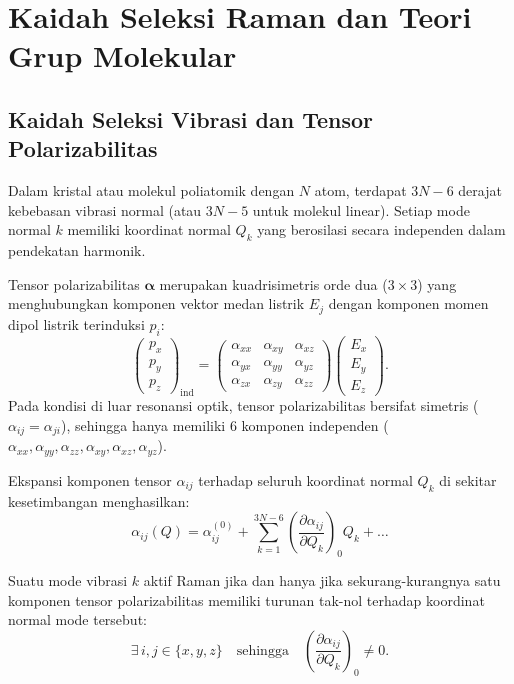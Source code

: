 \section{Kaidah Seleksi Raman dan Teori Grup Molekular}
\label{sec:kaidah_seleksi}

\subsection{Kaidah Seleksi Vibrasi dan Tensor Polarizabilitas}
Dalam kristal atau molekul poliatomik dengan $N$ atom, terdapat $3N - 6$ derajat kebebasan vibrasi normal (atau $3N - 5$ untuk molekul linear). Setiap mode normal $k$ memiliki koordinat normal $Q_k$ yang berosilasi secara independen dalam pendekatan harmonik.

Tensor polarizabilitas $\boldsymbol{\alpha}$ merupakan kuadrisimetris orde dua ($3 \times 3$) yang menghubungkan komponen vektor medan listrik $E_j$ dengan komponen momen dipol listrik terinduksi $p_i$:
\begin{equation}
\begin{pmatrix} p_x \\ p_y \\ p_z \end{pmatrix}_{\mathrm{ind}} =
\begin{pmatrix}
\alpha_{xx} & \alpha_{xy} & \alpha_{xz} \\
\alpha_{yx} & \alpha_{yy} & \alpha_{yz} \\
\alpha_{zx} & \alpha_{zy} & \alpha_{zz}
\end{pmatrix}
\begin{pmatrix} E_x \\ E_y \\ E_z \end{pmatrix}.
\label{eq:tensor_matrix}
\end{equation}
Pada kondisi di luar resonansi optik, tensor polarizabilitas bersifat simetris ($\alpha_{ij} = \alpha_{ji}$), sehingga hanya memiliki 6 komponen independen ($\alpha_{xx}, \alpha_{yy}, \alpha_{zz}, \alpha_{xy}, \alpha_{xz}, \alpha_{yz}$).

Ekspansi komponen tensor $\alpha_{ij}$ terhadap seluruh koordinat normal $Q_k$ di sekitar kesetimbangan menghasilkan:
\begin{equation}
\alpha_{ij}(Q) = \alpha_{ij}^{(0)} + \sum_{k=1}^{3N-6} \left( \frac{\partial \alpha_{ij}}{\partial Q_k} \right)_0 Q_k + \dots
\end{equation}

Suatu mode vibrasi $k$ aktif Raman jika dan hanya jika sekurang-kurangnya satu komponen tensor polarizabilitas memiliki turunan tak-nol terhadap koordinat normal mode tersebut:
\begin{equation}
\exists \, i, j \in \{x, y, z\} \quad \text{sehingga} \quad \left( \frac{\partial \alpha_{ij}}{\partial Q_k} \right)_0 \neq 0.
\label{eq:syarat_tensor_raman}
\end{equation}

